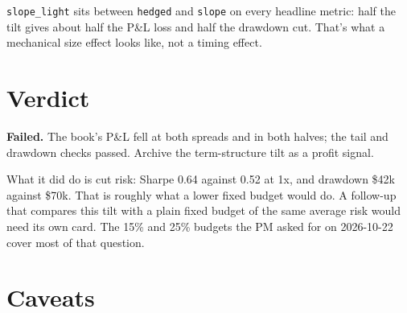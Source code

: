 \documentclass{article}
\begin{document}
\texttt{slope\_\allowbreak{}light} sits between \texttt{hedged} and \texttt{slope} on every headline metric: half the tilt gives about half the P\&L loss and half the drawdown cut. That's what a mechanical size effect looks like, not a timing effect.

\section{Verdict}

\textbf{Failed.} The book's P\&L fell at both spreads and in both halves; the tail and drawdown checks passed. Archive the term-structure tilt as a profit signal.

What it did do is cut risk: Sharpe 0.64 against 0.52 at 1x, and drawdown \$42k against \$70k. That is roughly what a lower fixed budget would do. A follow-up that compares this tilt with a plain fixed budget of the same average risk would need its own card. The 15\% and 25\% budgets the PM asked for on 2026-10-22 cover most of that question.

\section{Caveats}
\end{document}
